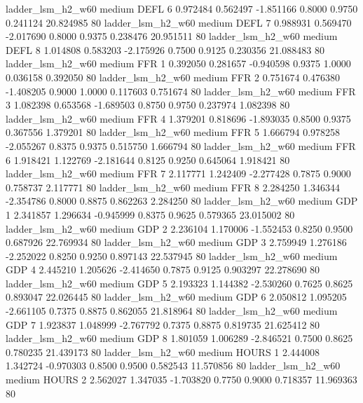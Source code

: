     ladder_lsm_h2_w60     medium     DEFL                 6  0.972484 0.562497 -1.851166 0.8000 0.9750  0.241124   20.824985 80
     ladder_lsm_h2_w60     medium     DEFL                 7  0.988931 0.569470 -2.017690 0.8000 0.9375  0.238476   20.951511 80
     ladder_lsm_h2_w60     medium     DEFL                 8  1.014808 0.583203 -2.175926 0.7500 0.9125  0.230356   21.088483 80
     ladder_lsm_h2_w60     medium      FFR                 1  0.392050 0.281657 -0.940598 0.9375 1.0000  0.036158    0.392050 80
     ladder_lsm_h2_w60     medium      FFR                 2  0.751674 0.476380 -1.408205 0.9000 1.0000  0.117603    0.751674 80
     ladder_lsm_h2_w60     medium      FFR                 3  1.082398 0.653568 -1.689503 0.8750 0.9750  0.237974    1.082398 80
     ladder_lsm_h2_w60     medium      FFR                 4  1.379201 0.818696 -1.893035 0.8500 0.9375  0.367556    1.379201 80
     ladder_lsm_h2_w60     medium      FFR                 5  1.666794 0.978258 -2.055267 0.8375 0.9375  0.515750    1.666794 80
     ladder_lsm_h2_w60     medium      FFR                 6  1.918421 1.122769 -2.181644 0.8125 0.9250  0.645064    1.918421 80
     ladder_lsm_h2_w60     medium      FFR                 7  2.117771 1.242409 -2.277428 0.7875 0.9000  0.758737    2.117771 80
     ladder_lsm_h2_w60     medium      FFR                 8  2.284250 1.346344 -2.354786 0.8000 0.8875  0.862263    2.284250 80
     ladder_lsm_h2_w60     medium      GDP                 1  2.341857 1.296634 -0.945999 0.8375 0.9625  0.579365   23.015002 80
     ladder_lsm_h2_w60     medium      GDP                 2  2.236104 1.170006 -1.552453 0.8250 0.9500  0.687926   22.769934 80
     ladder_lsm_h2_w60     medium      GDP                 3  2.759949 1.276186 -2.252022 0.8250 0.9250  0.897143   22.537945 80
     ladder_lsm_h2_w60     medium      GDP                 4  2.445210 1.205626 -2.414650 0.7875 0.9125  0.903297   22.278690 80
     ladder_lsm_h2_w60     medium      GDP                 5  2.193323 1.144382 -2.530260 0.7625 0.8625  0.893047   22.026445 80
     ladder_lsm_h2_w60     medium      GDP                 6  2.050812 1.095205 -2.661105 0.7375 0.8875  0.862055   21.818964 80
     ladder_lsm_h2_w60     medium      GDP                 7  1.923837 1.048999 -2.767792 0.7375 0.8875  0.819735   21.625412 80
     ladder_lsm_h2_w60     medium      GDP                 8  1.801059 1.006289 -2.846521 0.7500 0.8625  0.780235   21.439173 80
     ladder_lsm_h2_w60     medium    HOURS                 1  2.444008 1.342724 -0.970303 0.8500 0.9500  0.582543   11.570856 80
     ladder_lsm_h2_w60     medium    HOURS                 2  2.562027 1.347035 -1.703820 0.7750 0.9000  0.718357   11.969363 80
